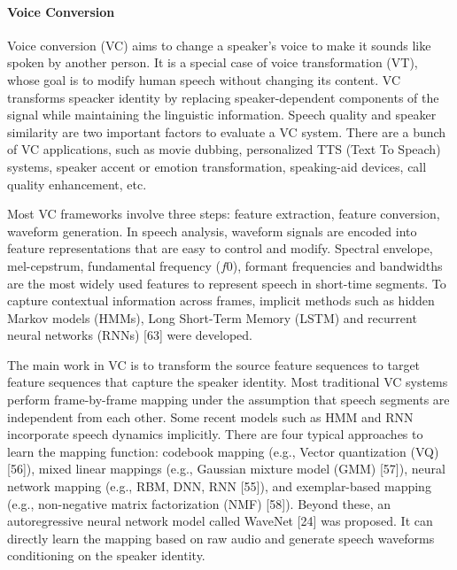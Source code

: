 \documentclass{article}
\begin{document}
\paragraph{Voice Conversion}
Voice conversion (VC) aims to change a speaker's voice to make it sounds like spoken by another person. It is a special case of voice transformation (VT), whose goal is to modify human speech without changing its content. VC transforms speacker identity by replacing speaker-dependent components of the signal while maintaining the linguistic information. Speech quality and speaker similarity are two important factors to evaluate a VC system. There are a bunch of VC applications, such as movie dubbing, personalized TTS (Text To Speach) systems, speaker accent or emotion transformation, speaking-aid devices, call quality enhancement, etc.

Most VC frameworks involve three steps: feature extraction, feature conversion, waveform generation. In speech analysis, waveform signals are encoded into feature representations that are easy to control and modify. Spectral envelope, mel-cepstrum, fundamental frequency ($f0$), formant frequencies and bandwidths are the most widely used features to represent speech in short-time segments. To capture contextual information across frames, implicit methods such as hidden Markov models (HMMs), Long Short-Term Memory (LSTM) and recurrent neural networks (RNNs) [63] were developed.

The main work in VC is to transform the source feature sequences to target feature sequences that capture the speaker identity. Most traditional VC systems perform frame-by-frame mapping under the assumption that speech segments are independent from each other. Some recent models such as HMM and RNN incorporate speech dynamics implicitly. There are four typical approaches to learn the mapping function: codebook mapping (e.g., Vector quantization (VQ) [56]), mixed linear mappings (e.g., Gaussian mixture model (GMM) [57]), neural network mapping (e.g., RBM, DNN, RNN [55]), and exemplar-based mapping (e.g., non-negative matrix factorization (NMF) [58]). Beyond these, an autoregressive neural network model called WaveNet [24] was proposed. It can directly learn the mapping based on raw audio and generate speech waveforms conditioning on the speaker identity.
\end{document}
